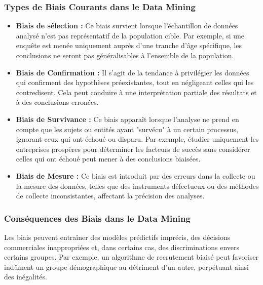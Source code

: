 \documentclass[a4paper,14pt]{article}
\begin{document}
		\subsubsection{Types de Biais Courants dans le Data Mining}
			\begin{itemize}
				\item \textbf{Biais de sélection :} Ce biais survient lorsque l'échantillon de données analysé n'est pas représentatif de la population cible. Par exemple, si une enquête est menée uniquement auprès d'une tranche d'âge spécifique, les conclusions ne seront pas généralisables à l'ensemble de la population.​
				\item \textbf{Biais de Confirmation :} Il s'agit de la tendance à privilégier les données qui confirment des hypothèses préexistantes, tout en négligeant celles qui les contredisent. Cela peut conduire à une interprétation partiale des résultats et à des conclusions erronées.​
				\item \textbf{Biais de Survivance :} Ce biais apparaît lorsque l'analyse ne prend en compte que les sujets ou entités ayant "survécu" à un certain processus, ignorant ceux qui ont échoué ou disparu. Par exemple, étudier uniquement les entreprises prospères pour déterminer les facteurs de succès sans considérer celles qui ont échoué peut mener à des conclusions biaisées.​
				\item \textbf{Biais de Mesure :} Ce biais est introduit par des erreurs dans la collecte ou la mesure des données, telles que des instruments défectueux ou des méthodes de collecte inconsistantes, affectant la précision des analyses.​
			\end{itemize}
			
		\subsubsection{Conséquences des Biais dans le Data Mining}
			Les biais peuvent entraîner des modèles prédictifs imprécis, des décisions commerciales inappropriées et, dans certains cas, des discriminations envers certains groupes. Par exemple, un algorithme de recrutement biaisé peut favoriser indûment un groupe démographique au détriment d'un autre, perpétuant ainsi des inégalités.
\end{document}
